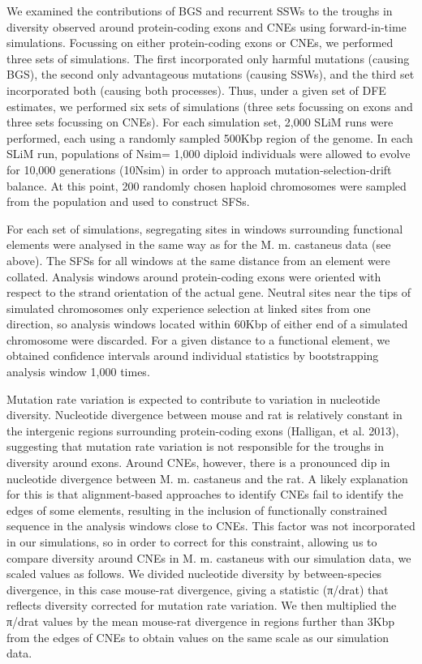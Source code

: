 We examined the contributions of BGS and recurrent SSWs to the troughs in diversity observed around protein-coding exons and CNEs using forward-in-time simulations. Focussing on either protein-coding exons or CNEs, we performed three sets of simulations. The first incorporated only harmful mutations (causing BGS), the second only advantageous mutations (causing SSWs), and the third set incorporated both (causing both processes). Thus, under a given set of DFE estimates, we performed six sets of simulations (three sets focussing on exons and three sets focussing on CNEs). For each simulation set, 2,000 SLiM runs were performed, each using a randomly sampled 500Kbp region of the genome. In each SLiM run, populations of Nsim= 1,000 diploid individuals were allowed to evolve for 10,000 generations (10Nsim) in order to approach mutation-selection-drift balance. At this point, 200 randomly chosen haploid chromosomes were sampled from the population and used to construct SFSs.
 
For each set of simulations, segregating sites in windows surrounding functional elements were analysed in the same way as for the M. m. castaneus data (see above). The SFSs for all windows at the same distance from an element were collated. Analysis windows around protein-coding exons were oriented with respect to the strand orientation of the actual gene. Neutral sites near the tips of simulated chromosomes only experience selection at linked sites from one direction, so analysis windows located within 60Kbp of either end of a simulated chromosome were discarded. For a given distance to a functional element, we obtained confidence intervals around individual statistics by bootstrapping analysis window 1,000 times.

Mutation rate variation is expected to contribute to variation in nucleotide diversity. Nucleotide divergence between mouse and rat is relatively constant in the intergenic regions surrounding protein-coding exons (Halligan, et al. 2013), suggesting that mutation rate variation is not responsible for the troughs in diversity around exons. Around CNEs, however, there is a pronounced dip in nucleotide divergence between M. m. castaneus and the rat. A likely explanation for this is that alignment-based approaches to identify CNEs fail to identify the edges of some elements, resulting in the inclusion of functionally constrained sequence in the analysis windows close to CNEs. This factor was not incorporated in our simulations, so in order to correct for this constraint, allowing us to compare diversity around CNEs in M. m. castaneus with our simulation data, we scaled values as follows. We divided nucleotide diversity by between-species divergence, in this case mouse-rat divergence, giving a statistic (π/drat) that reflects diversity corrected for mutation rate variation. We then multiplied the π/drat values by the mean mouse-rat divergence in regions further than 3Kbp from the edges of CNEs to obtain values on the same scale as our simulation data.

